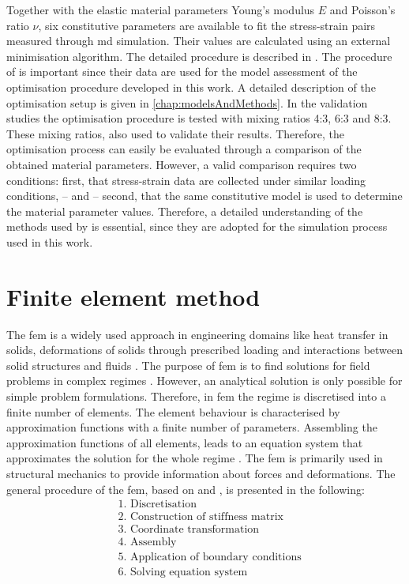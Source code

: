 Together with the elastic material parameters Young's modulus $E$ and Poisson's ratio $\nu$, six constitutive parameters are available to fit the stress-strain pairs measured through \acrshort{md} simulation. Their values are calculated using an external minimisation algorithm. The detailed procedure is described in \cite{ries_deciphering_nodate}. The procedure of \citet{ries_deciphering_nodate} is important since their data are used for the model assessment of the optimisation procedure developed in this work. A detailed description of the optimisation setup is given in \autoref{chap:modelsAndMethods}. In the validation studies the optimisation procedure is tested with mixing ratios 4:3, 6:3 and 8:3. These mixing ratios, \citet{ries_deciphering_nodate} also used to validate their results. Therefore, the optimisation process can easily be evaluated through a comparison of the obtained material parameters. However, a valid comparison requires two conditions: first, that stress-strain data are collected under similar loading conditions, – and – second, that the same constitutive model is used to determine the material parameter values. Therefore, a detailed understanding of the methods used by \citet{ries_deciphering_nodate} is essential, since they are adopted for the simulation process used in this work.  



\section{Finite element method} \label{sec: FEMBasics}

The \acrfull{fem} is a widely used approach in engineering domains like heat transfer in solids, deformations of solids through prescribed loading and interactions between solid structures and fluids \cite{jung_methode_2013}. 
The purpose of \acrshort{fem} is to find solutions for field problems in complex regimes \cite{willner_vorlesungsskript_nodate}. However, an analytical solution is only possible for simple problem formulations. Therefore, in \acrshort{fem} the regime is discretised into a finite number of elements. The element behaviour is characterised by approximation functions with a finite number of parameters. Assembling the approximation functions of all elements, leads to an equation system that approximates the solution for the whole regime \cite{jagota_finite_nodate}. The \acrshort{fem} is primarily used in structural mechanics to provide information about forces and deformations. The general procedure of the \acrshort{fem}, based on \citet{willner_vorlesungsskript_nodate} and \citet{steinke_finite-elemente-methode_2015}, is presented in the following: 
\begin{align*}
    &\text{1. Discretisation} \\
    &\text{2. Construction of stiffness matrix}\\ 
    &\text{3. Coordinate transformation} \\
    &\text{4. Assembly} \\
    &\text{5. Application of boundary conditions} \\
    &\text{6. Solving equation system}
\end{align*}

